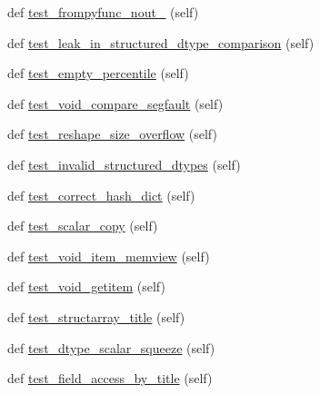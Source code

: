 \begin{DoxyCompactItemize}
\item 
def \hyperlink{classnumpy_1_1core_1_1tests_1_1test__regression_1_1TestRegression_aa6443cab34235c640e760a18ebf1e9bb}{test\+\_\+frompyfunc\+\_\+nout\+\_} (self)
\item 
def \hyperlink{classnumpy_1_1core_1_1tests_1_1test__regression_1_1TestRegression_a565da26af1ef988f706249c374103d34}{test\+\_\+leak\+\_\+in\+\_\+structured\+\_\+dtype\+\_\+comparison} (self)
\item 
def \hyperlink{classnumpy_1_1core_1_1tests_1_1test__regression_1_1TestRegression_abe1675c74fde098fdf7e12962752081f}{test\+\_\+empty\+\_\+percentile} (self)
\item 
def \hyperlink{classnumpy_1_1core_1_1tests_1_1test__regression_1_1TestRegression_a9bbce27b8237d86280946ed228e83bf6}{test\+\_\+void\+\_\+compare\+\_\+segfault} (self)
\item 
def \hyperlink{classnumpy_1_1core_1_1tests_1_1test__regression_1_1TestRegression_acbacab06f1cfdea8e4080554048edb4e}{test\+\_\+reshape\+\_\+size\+\_\+overflow} (self)
\item 
def \hyperlink{classnumpy_1_1core_1_1tests_1_1test__regression_1_1TestRegression_a67c214a87fc0d00969f26fe4586e0913}{test\+\_\+invalid\+\_\+structured\+\_\+dtypes} (self)
\item 
def \hyperlink{classnumpy_1_1core_1_1tests_1_1test__regression_1_1TestRegression_a6ca4916e69958fd665a2615af23d60e1}{test\+\_\+correct\+\_\+hash\+\_\+dict} (self)
\item 
def \hyperlink{classnumpy_1_1core_1_1tests_1_1test__regression_1_1TestRegression_a7ecd3470e6b3ba836eea303f20cad2cd}{test\+\_\+scalar\+\_\+copy} (self)
\item 
def \hyperlink{classnumpy_1_1core_1_1tests_1_1test__regression_1_1TestRegression_a058eff593233bfae51a59d5c1dbae797}{test\+\_\+void\+\_\+item\+\_\+memview} (self)
\item 
def \hyperlink{classnumpy_1_1core_1_1tests_1_1test__regression_1_1TestRegression_a1f8f50bb0520976aeded0881b08cfb3d}{test\+\_\+void\+\_\+getitem} (self)
\item 
def \hyperlink{classnumpy_1_1core_1_1tests_1_1test__regression_1_1TestRegression_abe213b1bb90a95ecddb735e134437e47}{test\+\_\+structarray\+\_\+title} (self)
\item 
def \hyperlink{classnumpy_1_1core_1_1tests_1_1test__regression_1_1TestRegression_aafc0457786579a63aa447493909d6651}{test\+\_\+dtype\+\_\+scalar\+\_\+squeeze} (self)
\item 
def \hyperlink{classnumpy_1_1core_1_1tests_1_1test__regression_1_1TestRegression_a50b51a7009cddcbd28f8e5083058ef80}{test\+\_\+field\+\_\+access\+\_\+by\+\_\+title} (self)

\end{DoxyCompactItemize}
